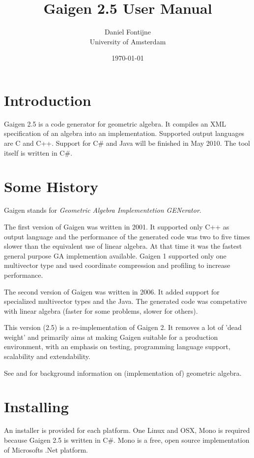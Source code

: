 \documentclass[10pt, a4paper]{article}
\begin{document}
\title{Gaigen 2.5 User Manual}
\author{
Daniel Fontijne\\University of Amsterdam 
}
\date{\today}
\maketitle

\section{Introduction}

Gaigen 2.5 is a code generator for geometric algebra. It compiles an XML specification
of an algebra into an implementation. Supported output languages are C and C++.
Support for C\# and Java will be finished in May 2010. The tool itself is written in C\#.

\section{Some History}

Gaigen stands for \emph{Geometric Algebra Implementetion GENerator}.

The first version of Gaigen was written in 2001. It supported only C++ as output language
and the performance of the generated code was two to five times slower than the equivalent
use of linear algebra. At that time it was the fastest general purpose GA implemention available. 
Gaigen 1 supported only one multivector type and used coordinate  compression and profiling to increase performance.

The second version of Gaigen was written in 2006. It added support for specialized multivector
types and the Java. The generated code was competative with linear algebra (faster for some problems,
slower for others).

This version (2.5) is a re-implementation of Gaigen 2. It removes a lot of 'dead weight' and
primarily aims at making Gaigen suitable for a production environment, with an emphasis on
testing, programming language support, scalability and extendability.

See \cite{GA4CS} and \cite{fontijnePhD} for background information on (implementation of) geometric algebra.


\section{Installing}

An installer is provided for each platform.
One Linux and OSX, Mono is required because Gaigen 2.5 is written in C\#.
Mono is a free, open source implementation of Microsofts .Net platform.
\end{document}
